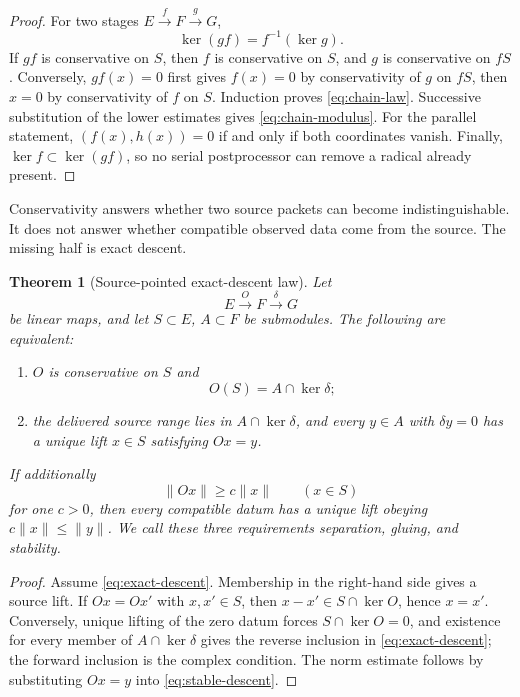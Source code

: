\documentclass[11pt]{article}
\newtheorem{theorem}{Theorem}[section]
\theoremstyle{definition}
\theoremstyle{remark}
\begin{document}
\begin{proof}
For two stages \(E\xrightarrow fF\xrightarrow gG\),
\[
                   \ker(gf)=f^{-1}(\ker g).
\]
If \(gf\) is conservative on \(S\), then \(f\) is conservative on \(S\),
and \(g\) is conservative on \(fS\).  Conversely, \(gf(x)=0\) first gives
\(f(x)=0\) by conservativity of \(g\) on \(fS\), then \(x=0\) by
conservativity of \(f\) on \(S\).  Induction proves
\eqref{eq:chain-law}.  Successive substitution of the lower estimates gives
\eqref{eq:chain-modulus}.
For the parallel statement, \((f(x),h(x))=0\) if and only if both
coordinates vanish.  Finally, \(\ker f\subset\ker(gf)\), so no serial
postprocessor can remove a radical already present.
\end{proof}

Conservativity answers whether two source packets can become
indistinguishable.  It does not answer whether compatible observed data come
from the source.  The missing half is exact descent.

\begin{theorem}[Source-pointed exact-descent law]
\label{thm:exact-descent}
Let
\[
                 E\xrightarrow{O}F\xrightarrow{\delta}G
\]
be linear maps, and let \(S\subset E\), \(A\subset F\) be submodules.  The
following are equivalent:
\begin{enumerate}[leftmargin=2.2em]
\item \(O\) is conservative on \(S\) and
\[
                         O(S)=A\cap\ker\delta;
\tag{2.0d}\label{eq:exact-descent}
\]
\item the delivered source range lies in \(A\cap\ker\delta\), and every
      \(y\in A\) with \(\delta y=0\) has a unique lift \(x\in S\) satisfying
      \(Ox=y\).
\end{enumerate}
If additionally
\[
                         \|Ox\|\ge c\|x\|\qquad(x\in S)
\tag{2.0e}\label{eq:stable-descent}
\]
for one \(c>0\), then every compatible datum has a unique lift obeying
\(c\|x\|\le\|y\|\).  We call these three requirements
\emph{separation}, \emph{gluing}, and \emph{stability}.
\end{theorem}

\begin{proof}
Assume \eqref{eq:exact-descent}.  Membership in the right-hand side gives a
source lift.  If \(Ox=Ox'\) with \(x,x'\in S\), then
\(x-x'\in S\cap\ker O\), hence \(x=x'\).  Conversely, unique lifting of the
zero datum forces \(S\cap\ker O=0\), and existence for every member of
\(A\cap\ker\delta\) gives the reverse inclusion in
\eqref{eq:exact-descent}; the forward inclusion is the complex condition.
The norm estimate follows by substituting \(Ox=y\) into
\eqref{eq:stable-descent}.
\end{proof}
\end{document}
